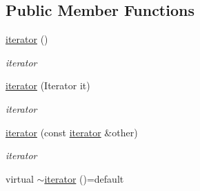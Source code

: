 \subsection*{Public Member Functions}
\begin{DoxyCompactItemize}
\item 
\hyperlink{classformat_1_1value_1_1iterator_af16610a1645c2e393a1bbd49f8bc2ec9}{iterator} ()\hypertarget{classformat_1_1value_1_1iterator_af16610a1645c2e393a1bbd49f8bc2ec9}{}\label{classformat_1_1value_1_1iterator_af16610a1645c2e393a1bbd49f8bc2ec9}

\begin{DoxyCompactList}\small\item\em iterator \end{DoxyCompactList}\item 
\hyperlink{classformat_1_1value_1_1iterator_a859a232d4c628e3c9a4d52828f3dd545}{iterator} (Iterator it)\hypertarget{classformat_1_1value_1_1iterator_a859a232d4c628e3c9a4d52828f3dd545}{}\label{classformat_1_1value_1_1iterator_a859a232d4c628e3c9a4d52828f3dd545}

\begin{DoxyCompactList}\small\item\em iterator \end{DoxyCompactList}\item 
\hyperlink{classformat_1_1value_1_1iterator_a77fcd6c18b944b672761468008630d22}{iterator} (const \hyperlink{classformat_1_1value_1_1iterator}{iterator} \&other)
\begin{DoxyCompactList}\small\item\em iterator \end{DoxyCompactList}\item 
virtual \hyperlink{classformat_1_1value_1_1iterator_a7be0b1d4266e27c28bfd376908b5611c}{$\sim$iterator} ()=default\hypertarget{classformat_1_1value_1_1iterator_a7be0b1d4266e27c28bfd376908b5611c}{}\label{classformat_1_1value_1_1iterator_a7be0b1d4266e27c28bfd376908b5611c}


\end{DoxyCompactItemize}
